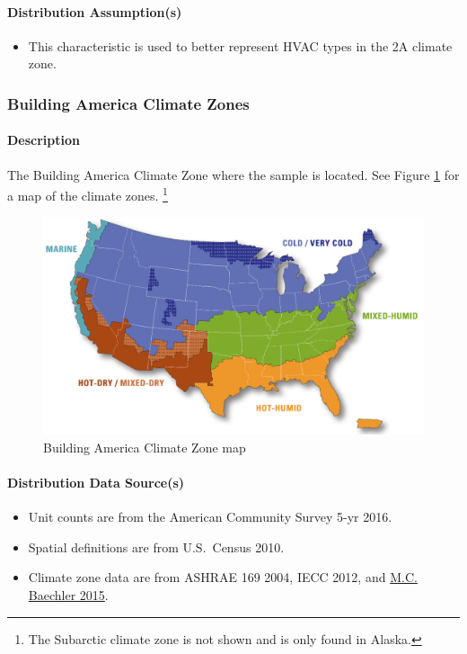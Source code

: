 \paragraph{Distribution Assumption(s)}
\begin{itemize}
    \item This characteristic is used to better represent HVAC types in the 2A climate zone.
\end{itemize}

\subsubsection{Building America Climate Zones}
\paragraph{Description}
The Building America Climate Zone where the sample is located. See Figure \ref{fig:building_america_cz} for a map of the climate zones. \footnote{The Subarctic climate zone is not shown and is only found in Alaska.}

\begin{figure}
    \centering
    \includegraphics[width=1\linewidth]{images/building_america_cz.png}
    \caption{Building America Climate Zone map}
    \label{fig:building_america_cz}
\end{figure}

\paragraph{Distribution Data Source(s)}
\begin{itemize}
    \item Unit counts are from the American Community Survey 5-yr 2016.
    \item Spatial definitions are from U.S.~Census 2010.
    \item Climate zone data are from ASHRAE 169 2004, IECC 2012, and \href{https://www.energy.gov/sites/prod/files/2015/10/f27/ba_climate_region_guide_7.3.pdf}{M.C. Baechler 2015}.
\end{itemize}

